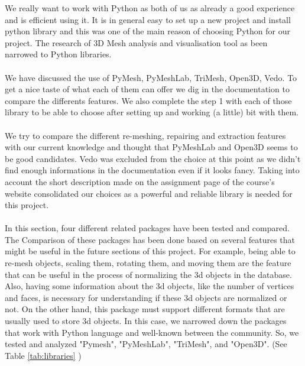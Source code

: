 \documentclass[10pt,twocolumn,letterpaper]{article}
\begin{document}
We really want to work with Python as both of us as already a good experience and is efficient using it. It is in general easy to set up a new project and install python library and this was one of the main reason of choosing Python for our project. The research of 3D Mesh analysis and visualisation tool as been narrowed to Python libraries. \\ \\
We have discussed the use of PyMesh, PyMeshLab, TriMesh, Open3D, Vedo. To get a nice taste of what each of them can offer we dig in the documentation to compare the differents features. We also complete the step 1 with each of those library to be able to choose after setting up and working (a little) bit with them. \\ \\
	We try to compare the different re-meshing, repairing and extraction features with our current knowledge and thought that PyMeshLab and Open3D seems to be good candidates. Vedo was excluded from the choice at this point as we didn't find enough informations in the documentation even if it looks fancy. Taking into account the short description made on the assignment page of the course's website consolidated our choices as a powerful and reliable library is needed for this project. \\ \\
In this section, four different related packages have been tested and compared. The Comparison of these packages has been done based on several features that might be useful in the future sections of this project. For example, being able to re-mesh objects, scaling them, rotating them, and moving them are the feature that can be useful in the process of normalizing the 3d objects in the database. Also, having some information about the 3d objects, like the number of vertices and faces, is necessary for understanding if these 3d objects are normalized or not. On the other hand, this package must support different formats that are usually used to store 3d objects.
In this case, we narrowed down the packages that work with Python language and well-known between the community. So, we tested and analyzed "Pymesh", "PyMeshLab", "TriMesh", and "Open3D". (See Table \ref{tab:libraries} )\\ \\
\end{document}
